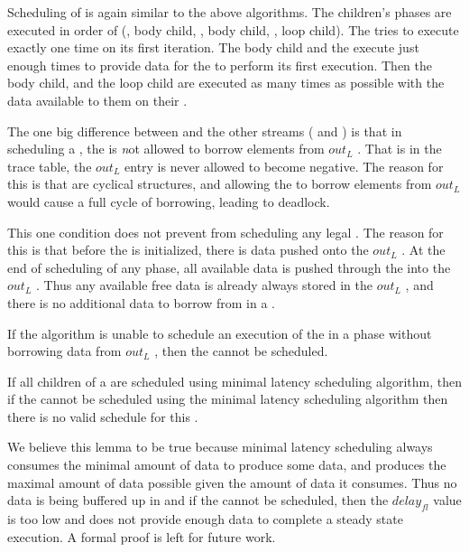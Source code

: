 Scheduling of {\feedbackloops} is again similar to the above
algorithms.  The children's phases are executed in order of
({\splitter}, body child, {\joiner}, body child, {\splitter}, loop
child).  The {\splitter} tries to execute exactly one time on its
first iteration.  The body child and the {\joiner} execute just
enough times to provide data for the {\splitter} to perform its
first execution.  Then the body child, {\splitter} and the loop
child are executed as many times as possible with the data
available to them on their {\Input} {{\Channels}}.

The one big difference between {\feedbackloop} and the other streams
({\pipeline} and {\splitjoin}) is that in scheduling a {\feedbackloop},
the {\joiner} is {\emph not} allowed to borrow elements from $out_L$
{{\Channel}}.  That is in the trace table, the $out_L$ entry is never
allowed to become negative.  The reason for this is that
{\feedbackloops} are cyclical structures, and allowing the {\joiner}
to borrow elements from $out_L$ would cause a full cycle of
borrowing, leading to deadlock.

This one condition does not prevent from scheduling any legal
{\feedbackloops}.  The reason for this is that before the
{\feedbackloop} is initialized, there is data pushed onto the
$out_L$ {{\Channel}}.  At the end of scheduling of any phase, all
available data is pushed through the {\feedbackloop} into the
$out_L$ {{\Channel}}.  Thus any available free data is already always
stored in the $out_L$ {{\Channel}}, and there is no additional data to
borrow from in a {\feedbackloop}.

If the algorithm is unable to schedule an execution of the {\joiner}
in a phase without borrowing data from $out_L$ {{\Channel}}, then the
{\feedbackloop} cannot be scheduled.

\begin{lemma}
If all children of a {\feedbackloop} are scheduled using minimal
latency scheduling algorithm, then if the {\feedbackloop} cannot
be scheduled using the minimal latency scheduling algorithm then
there is no valid schedule for this {\feedbackloop}.
\end{lemma}

We believe this lemma to be true because minimal latency
scheduling always consumes the minimal amount of data to produce
some data, and produces the maximal amount of data possible given
the amount of data it consumes.  Thus no data is being buffered up
in {{\Channels}} and if the {\feedbackloop} cannot be scheduled, then
the $delay_{fl}$ value is too low and does not provide enough data
to complete a steady state execution. A formal proof is left for
future work.

